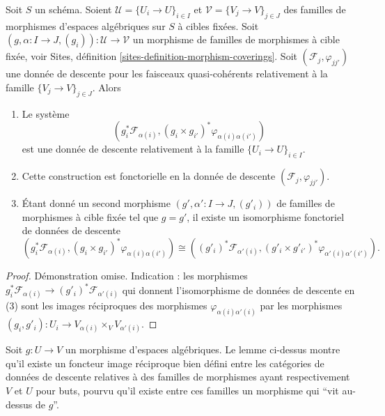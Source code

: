 \begin{lemma}
\label{lemma-map-families}
Soit $S$ un schéma.
Soient $\mathcal{U} = \{U_i \to U\}_{i \in I}$ et
$\mathcal{V} = \{V_j \to V\}_{j \in J}$
des familles de morphismes d'espaces algébriques sur $S$ à cibles fixées.
Soit $(g, \alpha : I \to J, (g_i)) : \mathcal{U} \to \mathcal{V}$
un morphisme de familles de morphismes à cible fixée, voir
Sites, définition \ref{sites-definition-morphism-coverings}.
Soit $(\mathcal{F}_j, \varphi_{jj'})$ une donnée de descente
pour les faisceaux quasi-cohérents relativement à la
famille $\{V_j \to V\}_{j \in J}$. Alors
\begin{enumerate}
\item Le système
$$
\left(g_i^*\mathcal{F}_{\alpha(i)},
(g_i \times g_{i'})^*\varphi_{\alpha(i)\alpha(i')}\right)
$$
est une donnée de descente relativement à la famille $\{U_i \to U\}_{i \in I}$.
\item Cette construction est fonctorielle en la donnée de descente
$(\mathcal{F}_j, \varphi_{jj'})$.
\item Étant donné un second morphisme
$(g', \alpha' : I \to J, (g'_i))$
de familles de morphismes à cible fixée
tel que $g = g'$, il existe un isomorphisme fonctoriel de données de descente
$$
(g_i^*\mathcal{F}_{\alpha(i)},
(g_i \times g_{i'})^*\varphi_{\alpha(i)\alpha(i')})
\cong
((g'_i)^*\mathcal{F}_{\alpha'(i)},
(g'_i \times g'_{i'})^*\varphi_{\alpha'(i)\alpha'(i')}).
$$
\end{enumerate}
\end{lemma}

\begin{proof}
Démonstration omise. Indication : les morphismes
$g_i^*\mathcal{F}_{\alpha(i)} \to (g'_i)^*\mathcal{F}_{\alpha'(i)}$
qui donnent l'isomorphisme de données de descente en (3)
sont les images réciproques des morphismes $\varphi_{\alpha(i)\alpha'(i)}$ par les
morphismes $(g_i, g'_i) : U_i \to V_{\alpha(i)} \times_V V_{\alpha'(i)}$.
\end{proof}

\noindent
Soit $g : U \to V$ un morphisme d'espaces algébriques.
Le lemme ci-dessus montre qu'il existe un foncteur image réciproque bien défini
entre les catégories de données de descente relatives à des familles de
morphismes ayant respectivement $V$ et $U$ pour buts, pourvu qu'il existe entre ces
familles un morphisme qui ``vit au-dessus de $g$''.

